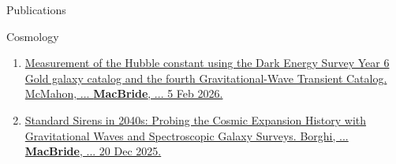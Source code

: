 \documentclass{resume} %
\begin{document}
\begin{rSection}{Publications}
\begin{rSubsection}{Cosmology}{}{}{}
\begin{enumerate}
    \item \href{https://arxiv.org/pdf/2602.04766}{Measurement of the Hubble constant using the Dark Energy Survey Year 6 Gold galaxy catalog and the fourth Gravitational-Wave Transient Catalog. McMahon, ... \textbf{MacBride}, ... 5 Feb 2026.} 
    \item \href{https://arxiv.org/pdf/2512.18369}{Standard Sirens in 2040s: Probing the Cosmic Expansion History with Gravitational Waves and Spectroscopic Galaxy Surveys. Borghi, ... \textbf{MacBride}, ... 20 Dec 2025.} 
    
    
\end{enumerate}
\end{rSubsection}


\end{rSection}
\end{document}
